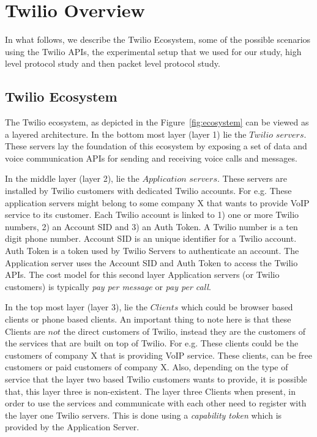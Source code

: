 \section{Twilio Overview}
\label{sec-twilioecoandprotocolstudy}
In what follows, we describe the Twilio Ecosystem, some of the possible scenarios using the Twilio APIs, the experimental setup that we used for our study, high level protocol study and then packet level protocol study.
\subsection{Twilio Ecosystem}
\label{subsec-twilioeco}
The Twilio ecosystem, as depicted in the Figure~\ref{fig:ecosystem} can be viewed as a layered architecture. In the bottom most layer (layer 1) lie the $Twilio$  $servers$. These servers lay the foundation of this ecosystem by exposing a set of data and voice communication APIs for sending and receiving voice calls and messages. 

In the middle layer (layer 2), lie the $Application$ $servers$. These servers are installed by Twilio customers with dedicated Twilio accounts. For e.g. These application servers might belong to some company X that wants to provide VoIP service to its customer. Each Twilio account is linked to 1) one or more Twilio numbers, 2) an Account SID and 3) an Auth Token. A Twilio number is a ten digit phone number. Account SID is an unique identifier for a Twilio account. Auth Token is a token used by Twilio Servers to authenticate an account. The Application server uses the Account SID and Auth Token to access the Twilio APIs. The cost model for this second layer Application servers (or Twilio customers) is typically \textit{pay per message} or \textit{pay per call}. 

In the top most layer (layer 3), lie the $Clients$ which could be browser based clients or phone based clients. An important thing to note here is that these Clients are $not$ the direct customers of Twilio, instead they are the customers of the services that are built on top of Twilio. For e.g. These clients could be the customers of company X that is providing VoIP service. These clients, can be free customers or paid customers of company X. Also, depending on the type of service that the layer two based Twilio customers wants to provide, it is possible that, this layer three is non-existent.  The layer three Clients when present, in order to use the services and communicate with each other need to register with the layer one Twilio servers. This is done using a \textit{capability token} which is provided by the Application Server. 

